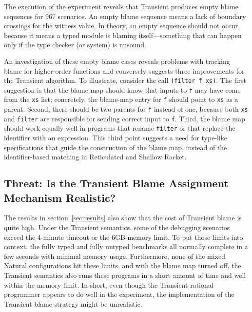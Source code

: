 The execution of the experiment reveals that Transient produces empty blame
sequences for 967 scenarios. An empty blame sequence means a lack of boundary
crossings for the witness value. In theory, an empty sequence should not occur,
because it means a typed module is blaming itself---something that can happen only
if the type checker (or system) is unsound.

An investigation of these empty blame cases reveals problems with tracking blame
for higher-order functions and conversely suggests three improvements for the
Transient algorithm. To illustrate, consider the call \texttt{(filter f xs)}.
The first suggestion is that the blame map should know that inputs to
\texttt{f} may have come from the \texttt{xs} list; concretely, the blame-map
entry for \texttt{f} should point to \texttt{xs} as a parent.
Second, there should be two parents for \texttt{f} instead of one, because
both \texttt{xs} and \texttt{filter} are responsible for sending correct input
to \texttt{f}. Third, the blame map should work equally well in programs
that rename \texttt{filter} or that replace the identifier with
an expression. This third point suggests a need for type-like specifications
that guide the construction of the blame map, instead of the identifier-based
matching in Reticulated and Shallow Racket.

\subsection{Threat: Is the Transient Blame Assignment Mechanism Realistic?}
\label{sec:threat:transient2}

The results in section~\ref{sec:results} also show that the cost of Transient
blame is quite high. Under the Transient semantics, some of the debugging
scenarios exceed the 4-minute timeout or the 6GB-memory limit. To put those
limits into context, the fully typed and fully untyped benchmarks all normally complete
in a few seconds with minimal memory usage. Furthermore, none of the mixed
Natural configurations hit these limits, and with the blame map turned off,
the Transient semantics also runs these programs in a short amount of time and
well within the memory limit. In short, even though the Transient rational
programmer appears to do well in the experiment, the implementation of the
Transient blame strategy might be unrealistic. 

